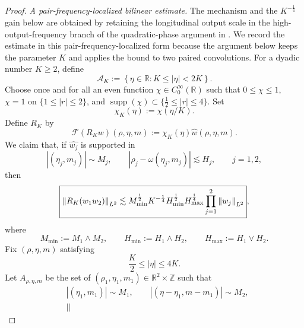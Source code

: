 \documentclass[12pt,oneside,reqno]{amsart}
\numberwithin{equation}{section}
\theoremstyle{plain}
\def\R{{\mathbb R}}
\def\Z{{\mathbb Z}}
\newcommand{\supp}{\operatorname{supp}}
\newcommand{\abs}[1]{%
    \left|#1\right|%
}
\newcommand{\brs}[1]{%
    \left\{#1\right\}
}
\newcommand{\Lpn}[2]{%
    \left\lVert #1\right\rVert_{L^{#2}}%
}
\newcommand{\Fh}[1]{\widehat{#1}}
\begin{document}
\begin{proof}
\medskip
\noindent
\emph{A pair-frequency-localized bilinear estimate.}
The mechanism and the $K^{-\frac14}$ gain below are obtained by retaining the
longitudinal output scale in the high-output-frequency branch of the
quadratic-phase argument in \cite[proof of Proposition~3.1]{farah2024note}.
We record the estimate in this pair-frequency-localized form because the
argument below keeps the parameter $K$ and applies the bound to two paired
convolutions. For a dyadic number $K\geq2$, define
\begin{equation}
    \mathcal A_K
    :=
    \brs{
        \eta\in\R:
        K\leq\abs{\eta}<2K
    }.
\end{equation}
Choose once and for all an even function $\chi\in C_0^\infty(\R)$ such that
$0\leq\chi\leq1$, $\chi=1$ on $\{1\leq\abs r\leq2\}$, and
$\supp(\chi)\subset\{\frac12\leq\abs r\leq4\}$. Set
\begin{equation}
    \chi_K(\eta):=\chi(\eta/K).
\end{equation}
Define $R_K$ by
\begin{equation}
    \mathcal F(R_Kw)(\rho,\eta,m)
    :=
    \chi_K(\eta)\Fh{w}(\rho,\eta,m).
\end{equation}
We claim that, if $\Fh{w_j}$ is supported in
\begin{equation}
    \abs{(\eta_j,m_j)}\sim M_j,
    \qquad
    \abs{
        \rho_j-\omega(\eta_j,m_j)
    }
    \lesssim H_j,
    \qquad
    j=1,2,
\end{equation}
then
\begin{equation}
\label{eq:case6-bilinear-estimate}
    \boxed{
    \Lpn{R_K(w_1w_2)}{2}
    \lesssim
    M_{\min}^{\frac12}
    K^{-\frac14}
    H_{\min}^{\frac12}
    H_{\max}^{\frac14}
    \prod_{j=1}^2
    \Lpn{w_j}{2}
    },
\end{equation}
where
\begin{equation}
    M_{\min}:=M_1\wedge M_2,
    \qquad
    H_{\min}:=H_1\wedge H_2,
    \qquad
    H_{\max}:=H_1\vee H_2.
\end{equation}
Fix $(\rho,\eta,m)$ satisfying
\begin{equation}
    \frac K2
    \leq
    \abs{\eta}
    \leq
    4K.
\end{equation}
Let $A_{\rho,\eta,m}$ be the set of
$(\rho_1,\eta_1,m_1)\in\R^2\times\Z$ such that
\begin{equation}
\begin{aligned}
    &\abs{(\eta_1,m_1)}\sim M_1,
    \qquad
    \abs{(\eta-\eta_1,m-m_1)}\sim M_2,
    \\
    &\abs{
}
\end{aligned}
\end{equation}
\end{proof}
\end{document}
